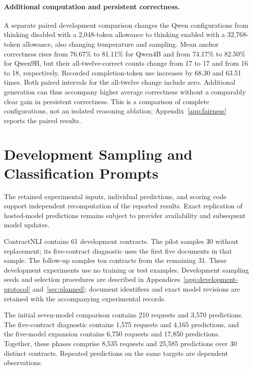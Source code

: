 \documentclass{article}
\begin{document}
\paragraph{Additional computation and persistent correctness.}
A separate paired development comparison changes the Qwen configurations from thinking disabled with a 2,048-token allowance to thinking enabled with a 32,768-token allowance, also changing temperature and sampling. Mean anchor correctness rises from 76.67\% to 81.11\% for Qwen4B and from 74.17\% to 82.50\% for Qwen9B, but their all-twelve-correct counts change from 17 to 17 and from 16 to 18, respectively. Recorded completion-token use increases by 68.30 and 63.51 times. Both paired intervals for the all-twelve change include zero. Additional generation can thus accompany higher average correctness without a comparably clear gain in persistent correctness. This is a comparison of complete configurations, not an isolated reasoning ablation; Appendix~\ref{app:fairness} reports the paired results.





\section{Development Sampling and Classification Prompts}
\label{app:repro}
The retained experimental inputs, individual predictions, and scoring code support independent recomputation of the reported results. Exact replication of hosted-model predictions remains subject to provider availability and subsequent model updates.

ContractNLI contains 61 development contracts. The pilot samples 30 without replacement; its five-contract diagnostic uses the first five documents in that sample. The follow-up samples ten contracts from the remaining 31. These development experiments use no training or test examples. Development sampling seeds and selection procedures are described in Appendices~\ref{app:development-protocol} and~\ref{sec:planned}; document identifiers and exact model revisions are retained with the accompanying experimental records.

The initial seven-model comparison contains 210 requests and 3,570 predictions. The five-contract diagnostic contains 1,575 requests and 4,165 predictions, and the five-model expansion contains 6,750 requests and 17,850 predictions. Together, these phases comprise 8,535 requests and 25,585 predictions over 30 distinct contracts. Repeated predictions on the same targets are dependent observations.
\end{document}
